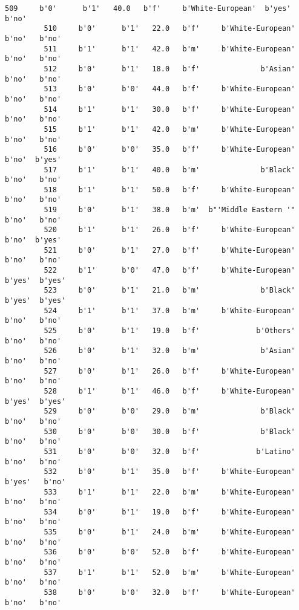 \documentclass[11pt]{article}
\begin{document}
\begin{Verbatim}[commandchars=\\\{\}]
         509     b'0'      b'1'   40.0   b'f'     b'White-European'  b'yes'   b'no'   
         510     b'0'      b'1'   22.0   b'f'     b'White-European'   b'no'   b'no'   
         511     b'1'      b'1'   42.0   b'm'     b'White-European'   b'no'   b'no'   
         512     b'0'      b'1'   18.0   b'f'              b'Asian'   b'no'   b'no'   
         513     b'0'      b'0'   44.0   b'f'     b'White-European'   b'no'   b'no'   
         514     b'1'      b'1'   30.0   b'f'     b'White-European'   b'no'   b'no'   
         515     b'1'      b'1'   42.0   b'm'     b'White-European'   b'no'   b'no'   
         516     b'0'      b'0'   35.0   b'f'     b'White-European'   b'no'  b'yes'   
         517     b'1'      b'1'   40.0   b'm'              b'Black'   b'no'   b'no'   
         518     b'1'      b'1'   50.0   b'f'     b'White-European'   b'no'   b'no'   
         519     b'0'      b'1'   38.0   b'm'  b"'Middle Eastern '"   b'no'   b'no'   
         520     b'1'      b'1'   26.0   b'f'     b'White-European'   b'no'  b'yes'   
         521     b'0'      b'1'   27.0   b'f'     b'White-European'   b'no'   b'no'   
         522     b'1'      b'0'   47.0   b'f'     b'White-European'  b'yes'  b'yes'   
         523     b'0'      b'1'   21.0   b'm'              b'Black'  b'yes'  b'yes'   
         524     b'1'      b'1'   37.0   b'm'     b'White-European'   b'no'   b'no'   
         525     b'0'      b'1'   19.0   b'f'             b'Others'   b'no'   b'no'   
         526     b'0'      b'1'   32.0   b'm'              b'Asian'   b'no'   b'no'   
         527     b'0'      b'1'   26.0   b'f'     b'White-European'   b'no'   b'no'   
         528     b'1'      b'1'   46.0   b'f'     b'White-European'  b'yes'  b'yes'   
         529     b'0'      b'0'   29.0   b'm'              b'Black'   b'no'   b'no'   
         530     b'0'      b'0'   30.0   b'f'              b'Black'   b'no'   b'no'   
         531     b'0'      b'0'   32.0   b'f'             b'Latino'   b'no'   b'no'   
         532     b'0'      b'1'   35.0   b'f'     b'White-European'  b'yes'   b'no'   
         533     b'1'      b'1'   22.0   b'm'     b'White-European'   b'no'   b'no'   
         534     b'0'      b'1'   19.0   b'f'     b'White-European'   b'no'   b'no'   
         535     b'0'      b'1'   24.0   b'm'     b'White-European'   b'no'   b'no'   
         536     b'0'      b'0'   52.0   b'f'     b'White-European'   b'no'   b'no'   
         537     b'1'      b'1'   52.0   b'm'     b'White-European'   b'no'   b'no'   
         538     b'0'      b'0'   32.0   b'f'     b'White-European'   b'no'   b'no'   

\end{Verbatim}
\end{document}
